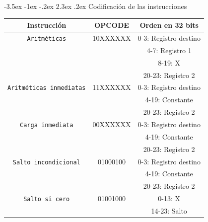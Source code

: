 \documentclass[11pt]{report}
\makeatletter
\renewcommand\chapter{\@startsection{chapter}{0}{\z@}%
    {-3.5ex \@plus -1ex \@minus -.2ex}%
    {2.3ex \@plus.2ex}%
    {\normalfont\Large\bfseries}}
\makeatother
\begin{document}
\chapter{Codificación de las instrucciones}
\begin{table}[H]
  \centering
  \begin{tabular}{|c|c|c|}
    \hline
    \textbf{Instrucción}                          & \textbf{OPCODE} & \textbf{Orden en 32  bits} \\ \hline
    \texttt{Aritméticas}                          & 10XXXXXX        & 0-3: Registro destino      \\
                                                  &                 & 4-7: Registro 1            \\
                                                  &                 & 8-19: X                    \\
                                                  &                 & 20-23: Registro 2          \\ \hline
    \texttt{Aritméticas inmediatas}               & 11XXXXXX        & 0-3: Registro destino      \\
                                                  &                 & 4-19: Constante            \\
                                                  &                 & 20-23: Registro 2          \\ \hline
    \texttt{Carga inmediata}                      & 00XXXXXX        & 0-3: Registro destino      \\
                                                  &                 & 4-19: Constante            \\
                                                  &                 & 20-23: Registro 2          \\ \hline
    \texttt{Salto incondicional}                  & 01000100        & 0-3: Registro destino      \\
                                                  &                 & 4-19: Constante            \\
                                                  &                 & 20-23: Registro 2          \\ \hline
    \texttt{Salto si cero}                        & 01001000        & 0-13: X                    \\
                                                  &                 & 14-23: Salto               \\ \hline

\end{tabular}
\end{table}
\end{document}
